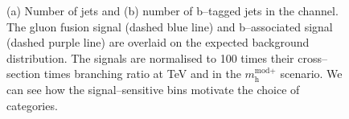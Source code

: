 \begin{figure}[h!]
\begin{center}
\end{center}
\caption{(a) Number of jets and (b) number of b--tagged jets in the \mutau channel. The gluon fusion signal (dashed
blue line) and b--associated signal (dashed purple line) are overlaid on the expected background distribution. The signals
are normalised to 100 times their cross--section times branching ratio at  TeV and  in the $m_{\text{h}}^{\text{mod+}}$
scenario. We can see how the signal--sensitive bins motivate the choice of categories.}
\label{fig:mssm_cats_mt}
\end{figure}

